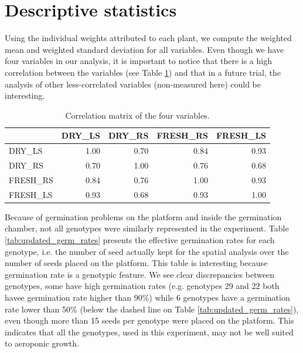 \section{Descriptive statistics}

Using the individual weights attributed to each plant, we compute the weighted mean and weighted standard deviation for all variables. Even though we have four variables in our analysis, it is important to notice that there is a high correlation between the variables (see Table \ref{tab:var_correlation}) and that in a future trial, the analysis of other less-correlated variables (non-measured here) could be interesting.\\

\begin{table}[ht]
\centering
 \caption{Correlation matrix of the four variables.}
\begin{tabular}{lrrrr}
  \toprule
 & DRY\_LS & DRY\_RS & FRESH\_RS & FRESH\_LS \\ 
  \midrule
DRY\_LS & 1.00 & 0.70 & 0.84 & 0.93 \\ 
  DRY\_RS & 0.70 & 1.00 & 0.76 & 0.68 \\ 
  FRESH\_RS & 0.84 & 0.76 & 1.00 & 0.93 \\ 
  FRESH\_LS & 0.93 & 0.68 & 0.93 & 1.00 \\ 
   \bottomrule
\end{tabular}
\label{tab:var_correlation}
\end{table}

Because of germination problems on the platform and inside the germination chamber, not all genotypes were similarly represented in the experiment. Table \ref{tab:updated_germ_rates} presents the effective germination rates for each genotype, i.e. the number of seed actually kept for the spatial analysis over the number of seeds placed on the platform. This table is interesting because germination rate is a genotypic feature. We see clear discrepancies between genotypes, some have high germination rates (e.g. genotypes 29 and 22 both havee germination rate higher than 90\%) while 6 genotypes have a germination rate lower than 50\% (below the dashed line on Table \ref{tab:updated_germ_rates}), even though more than 15 seeds per genotype were placed on the platform. This indicates that all the genotypes, used in this experiment, may not be well suited to aeroponic growth.\\

